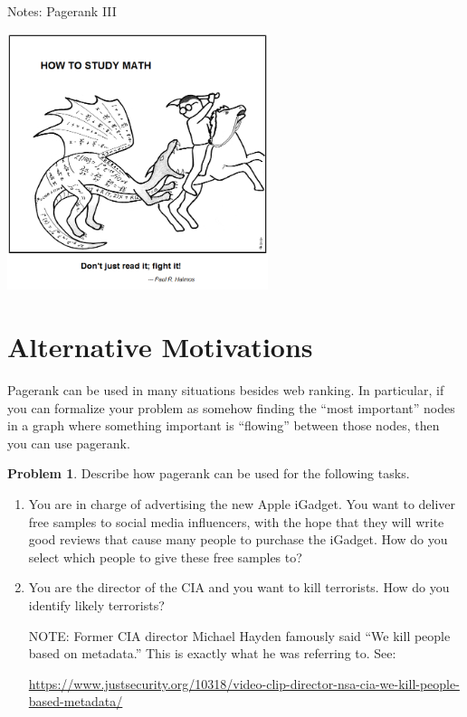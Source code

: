 \documentclass[10pt]{exam}
\theoremstyle{definition}
\newtheorem{problem}{Problem}
\begin{document}
\begin{center}
{
\Huge
Notes: Pagerank III
}

\vspace{0.15in}
\includegraphics[width=3in]{saint_curious_george}
\vspace{-0.15in}

\end{center}

\begin{center}
\end{center}

\section{Alternative Motivations}

Pagerank can be used in many situations besides web ranking.
In particular, if you can formalize your problem as somehow finding the ``most important'' nodes in a graph where something important is ``flowing'' between those nodes,
then you can use pagerank.

\begin{problem}
    Describe how pagerank can be used for the following tasks.
    \begin{enumerate}
        \item 
            You are in charge of advertising the new Apple iGadget.
            You want to deliver free samples to social media influencers,
            with the hope that they will write good reviews that cause many people to purchase the iGadget.
            How do you select which people to give these free samples to?
            \newpage
        \item 
            You are the director of the CIA and you want to kill terrorists.
            How do you identify likely terrorists?


            \vspace{8in}
            NOTE:
            Former CIA director Michael Hayden famously said ``We kill people based on metadata.''
            This is exactly what he was referring to.
            See:

            \url{https://www.justsecurity.org/10318/video-clip-director-nsa-cia-we-kill-people-based-metadata/}
    \end{enumerate}
\end{problem}
\end{document}
